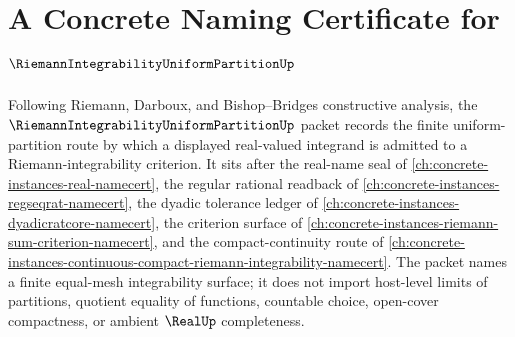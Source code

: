 \chapter{A Concrete Naming Certificate for $\RiemannIntegrabilityUniformPartitionUp$}
\label{ch:concrete-instances-riemann-integrability-uniform-partition-namecert}

Following Riemann, Darboux, and Bishop--Bridges constructive analysis, the $\RiemannIntegrabilityUniformPartitionUp$ packet records the finite uniform-partition route by which a displayed real-valued integrand is admitted to a Riemann-integrability criterion. It sits after the real-name seal of \autoref{ch:concrete-instances-real-namecert}, the regular rational readback of \autoref{ch:concrete-instances-regseqrat-namecert}, the dyadic tolerance ledger of \autoref{ch:concrete-instances-dyadicratcore-namecert}, the criterion surface of \autoref{ch:concrete-instances-riemann-sum-criterion-namecert}, and the compact-continuity route of \autoref{ch:concrete-instances-continuous-compact-riemann-integrability-namecert}. The packet names a finite equal-mesh integrability surface; it does not import host-level limits of partitions, quotient equality of functions, countable choice, open-cover compactness, or ambient $\RealUp$ completeness.


